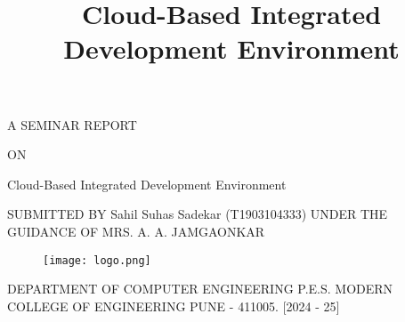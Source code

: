 \documentclass[12pt,a4paper,final]{report}
\title{Cloud-Based Integrated Development Environment}
\begin{document}
\begin{center}
\thispagestyle{empty}
\vspace*{1cm}
A SEMINAR REPORT
\vspace*{0.75cm}

ON
\vspace*{0.75cm}

\Large
Cloud-Based Integrated Development Environment
\vspace*{0.75cm}


\vspace*{0.5cm}
SUBMITTED BY
\vspace*{0.35cm}
\linebreak
\linebreak
Sahil Suhas Sadekar (T1903104333)
\linebreak
\linebreak
\vspace*{0.5cm}
\linebreak
UNDER THE GUIDANCE OF
\vspace*{0.35cm}
\linebreak
\linebreak
MRS. A. A. JAMGAONKAR
\vspace*{0.3cm}
\normalsize
\begin{figure}[h]
\begin{center}
\texttt{[image: logo.png]}
\end{center}
\end{figure}



\large
\vspace*{0.3cm}
DEPARTMENT OF COMPUTER ENGINEERING
\linebreak
P.E.S. MODERN COLLEGE OF ENGINEERING
\linebreak
PUNE - 411005.
\linebreak
$[$2024 - 25$]$ 
\end{center}
\newpage
\end{document}
